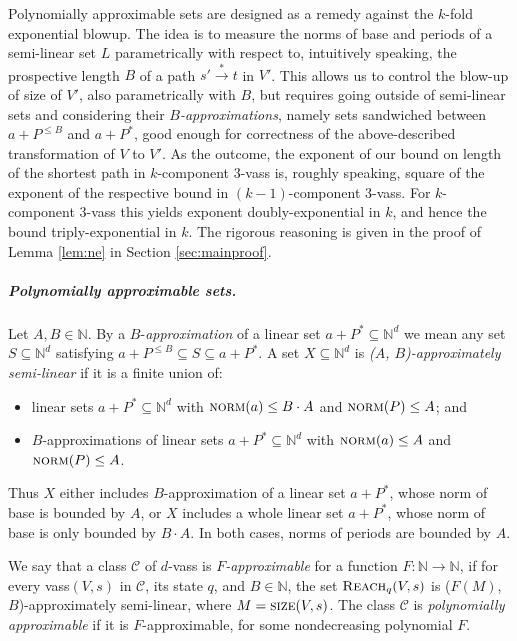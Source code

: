 \documentclass[a4paper, UKenglish, cleveref, autoref, thm-restate]{lipics-v2021}
\newcommand{\Sandwich}{Polynomially approximable\xspace}
\newcommand{\sandwich}{polynomially approximable\xspace}
\newcommand{\parsandwich}[1]{#1-approximable\xspace}
\newcommand{\C}{\mathcal{C}}
\newcommand{\N}{\mathbb{N}}
\newcommand{\reach}{\textsc{Reach}}
\newcommand{\trans}[1]{\stackrel{#1}{\longrightarrow}}
\newcommand{\tran}{\trans{*}}
\newcommand{\norm}{\textsc{norm}}
\newcommand{\size}{\textsc{size}}
\newcommand{\kanapka}[2]{(#1, #2)-approximately semi-linear}
\newcommand{\vass}{{\sc vass}\xspace}
\newcommand{\tvass}{\parvass 3}
\newcommand{\parvass}[1]{{$#1$-\vass}\xspace}
\renewcommand{\C}{\mathcal{C}}
\newcommand{\para}[1]{\vspace{-3mm}\subparagraph*{\bf #1.}}
\begin{document}
\Sandwich sets are designed as a remedy against the $k$-fold exponential blowup.
The idea is to measure the norms of base and periods of a semi-linear set $L$ 
parametrically with respect to, intuitively speaking, 
the prospective length $B$ of a path $s'\tran t$ in $V'$.
This allows us to control the blow-up of size of $V'$,
also parametrically with $B$, but requires
going outside of semi-linear sets and considering their \emph{$B$-approximations},
namely sets sandwiched between $a+P^{\leq B}$ and $a+P^*$,
good enough for correctness of the above-described transformation
of $V$ to $V'$.
As the outcome, the exponent of our bound on length of the shortest path in $k$-component \tvass
is, roughly speaking, square of the exponent of the respective bound in $(k-1)$-component \tvass. 
For $k$-component \tvass this yields exponent doubly-exponential in $k$, and hence the bound triply-exponential in $k$.
The rigorous reasoning is given in the proof of Lemma \ref{lem:ne} in Section \ref{sec:mainproof}.


\para{\Sandwich sets}

Let $A, B\in \N$.
By a $B$-\emph{approximation}
of a linear set $a + P^*\subseteq \N^d$ we mean any set $S\subseteq \N^d$ satisfying 
$
a + P^{\leq B} \subseteq S \subseteq a+P^*.
$
A set $X\subseteq \N^d$ is \emph{\kanapka {$A$} {$B$}}
if it is a finite union of:

\begin{itemize}
  \item linear sets $a + P^* \subseteq \N^d$ with $\norm(a) \leq B \cdot A$ and
  $\norm(P) \leq A$; and
  \item $B$-approximations of linear sets $a + P^* \subseteq \N^d$ with $\norm(a) \leq A$ and
  $\norm(P) \leq A$.
\end{itemize}


\noindent
Thus $X$ either includes 
$B$-approximation of a linear set $a+P^*$, whose norm of base is bounded by $A$,
or $X$ includes 
a whole linear set $a+P^*$, whose norm of base is only bounded by $B\cdot A$.
In both cases, norms of periods are bounded by $A$.

We say that a class $\C$ of \parvass d is \emph{\parsandwich{$F$}} for a function $F: \N \to \N$,
if for every \vass $(V, s)$ in $\C$, its state $q$,
and $B\in\N$,
the set $\reach_q(V,s)$ is \kanapka {$F(M)$} {$B$}, where $M=\size(V,s)$.
The class $\C$ is \emph{\sandwich} if it is \parsandwich{$F$}, for some nondecreasing 
polynomial $F$.
\end{document}
